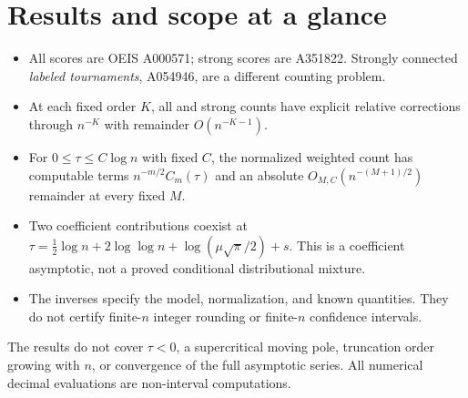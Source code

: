 \documentclass[11pt]{article}
\theoremstyle{remark}\newtheorem{remark}[theorem]{Remark}
\theoremstyle{definition}\newtheorem{definition}[theorem]{Definition}
\begin{document}
\begin{abstract}
\emph{Part~III} (added 5 October 2026) treats the supercritical side that Parts~I and~II exclude, on a fixed small interval of weights above the critical one. The weighted count is an exact moving-pole residue plus a branch-cut expansion to every fixed order, uniformly through criticality, with computable kernels resolving the coalescence at $nt=O(1)$, where $t$ is the excess growth rate. The block statistics change on the different scale $tn^{2/3}=O(1)$: the centred block count has a tempered $3/2$-stable limit, Gaussian beyond that scale, and the large blocks form a tempered Poisson process whose maximum passes from the critical Fr\'echet-type law to a Gumbel law. Convergent Puiseux inversion of the free energy and Lambert-$W$ centrings complete the inverse direction. Its critical-endpoint terms re-prove Part~I's critical expansion, adding its $n^{-3/2}$ coefficient; its other overlaps with Parts~I and~II (the block decomposition, the tail constants, the large-$a$ kernel series, the fixed-weight branch amplitude, and at $\sigma=0$ the count and maximum laws of Part~II's Theorem~\ref{tss:cx:thm:fluid}) are credited in its provenance note, and the rest is new to the repository \textup{(wording corrected after the independent check of 7~October 2026; the first wording read ``its critical-endpoint terms re-prove Part~I's critical expansion, adding its $n^{-3/2}$ coefficient; the rest is new to the repository'', which omitted the overlaps that the provenance note of Part~\ref{tss:sc:part} lists)}.
\end{abstract}

\section*{Results and scope at a glance}
\begin{itemize}
\item All scores are OEIS A000571; strong scores are A351822. Strongly connected \emph{labeled tournaments}, A054946, are a different counting problem.
\item At each fixed order $K$, all and strong counts have explicit relative corrections through $n^{-K}$ with remainder $O(n^{-K-1})$.
\item For $0\leq\tau\leq C\log n$ with fixed $C$, the normalized weighted count has computable terms $n^{-m/2}C_m(\tau)$ and an absolute $O_{M,C}(n^{-(M+1)/2})$ remainder at every fixed $M$.
\item Two coefficient contributions coexist at
$\tau=\frac12\log n+2\log\log n+\log(\mu\sqrt\pi/2)+s$.
This is a coefficient asymptotic, not a proved conditional distributional mixture.
\item The inverses specify the model, normalization, and known quantities. They do not certify finite-$n$ integer rounding or finite-$n$ confidence intervals.
\end{itemize}
\smallskip
The results do not cover $\tau<0$, a supercritical moving pole, truncation order growing with $n$, or convergence of the full asymptotic series. All numerical decimal evaluations are non-interval computations.
\end{document}
